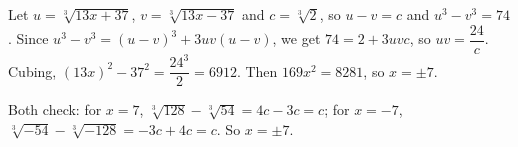 Let $u=\sqrt[3]{13x+37}$, $v=\sqrt[3]{13x-37}$ and $c=\sqrt[3]2$, so $u-v=c$ and $u^3-v^3=74$. Since $u^3-v^3=(u-v)^3+3uv(u-v)$, we get $74=2+3uvc$, so $uv=\dfrac{24}c$. Cubing, $(13x)^2-37^2=\dfrac{24^3}2=6912$. Then $169x^2=8281$, so $x=\pm7$.

Both check: for $x=7$, $\sqrt[3]{128}-\sqrt[3]{54}=4c-3c=c$; for $x=-7$, $\sqrt[3]{-54}-\sqrt[3]{-128}=-3c+4c=c$. So $\boxed{x=\pm7}$.

